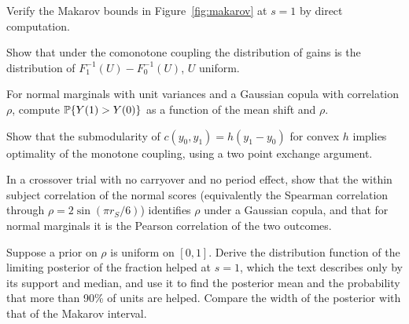 \begin{exercises}
\item\label{ex:ch09:1} Verify the Makarov bounds in Figure~\ref{fig:makarov} at $s = 1$ by direct computation.
\item\label{ex:ch09:2} Show that under the comonotone coupling the distribution of gains is the distribution of $F_1^{-1}(U) - F_0^{-1}(U)$, $U$ uniform.
\item\label{ex:ch09:3} For normal marginals with unit variances and a Gaussian copula with correlation $\rho$, compute $\mathbb{P}\{Y(1) > Y(0)\}$ as a function of the mean shift and $\rho$.
\item\label{ex:ch09:4} Show that the submodularity of $c(y_0, y_1) = h(y_1 - y_0)$ for convex $h$ implies optimality of the monotone coupling, using a two point exchange argument.
\item\label{ex:ch09:5} In a crossover trial with no carryover and no period effect, show that the within subject correlation of the normal scores (equivalently the Spearman correlation through $\rho = 2\sin(\pi r_S/6)$) identifies $\rho$ under a Gaussian copula, and that for normal marginals it is the Pearson correlation of the two outcomes.
\item\label{ex:ch09:6} Suppose a prior on $\rho$ is uniform on $[0, 1]$. Derive the distribution function of the limiting posterior of the fraction helped at $s = 1$, which the text describes only by its support and median, and use it to find the posterior mean and the probability that more than 90\% of units are helped. Compare the width of the posterior with that of the Makarov interval.
\end{exercises}
